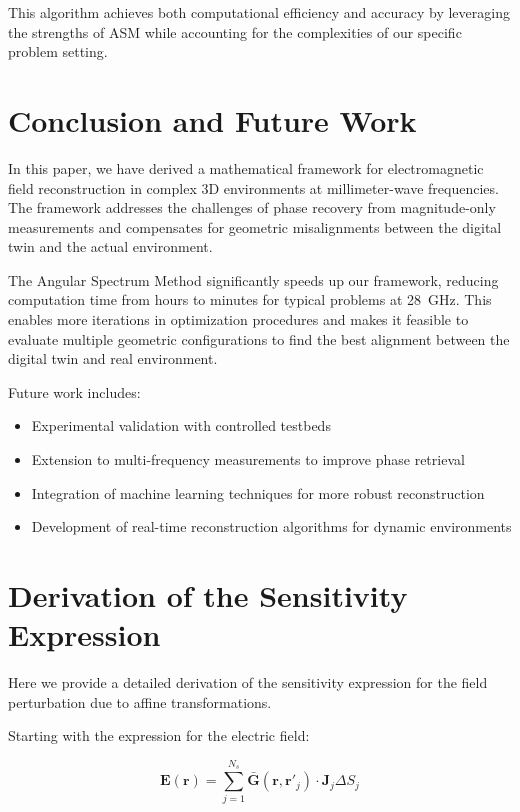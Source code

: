 \documentclass[12pt,a4paper]{article}
\begin{document}
This algorithm achieves both computational efficiency and accuracy by leveraging the strengths of ASM while accounting for the complexities of our specific problem setting.

\section{Conclusion and Future Work}

In this paper, we have derived a mathematical framework for electromagnetic field reconstruction in complex 3D environments at millimeter-wave frequencies. The framework addresses the challenges of phase recovery from magnitude-only measurements and compensates for geometric misalignments between the digital twin and the actual environment.

The Angular Spectrum Method significantly speeds up our framework, reducing computation time from hours to minutes for typical problems at \SI{28}{\giga\hertz}. This enables more iterations in optimization procedures and makes it feasible to evaluate multiple geometric configurations to find the best alignment between the digital twin and real environment.

Future work includes:
\begin{itemize}
    \item Experimental validation with controlled testbeds
    \item Extension to multi-frequency measurements to improve phase retrieval
    \item Integration of machine learning techniques for more robust reconstruction
    \item Development of real-time reconstruction algorithms for dynamic environments
\end{itemize}

\appendix
\section{Derivation of the Sensitivity Expression}

Here we provide a detailed derivation of the sensitivity expression for the field perturbation due to affine transformations.

Starting with the expression for the electric field:

\begin{equation}
    \mathbf{E}(\mathbf{r}) = \sum_{j=1}^{N_s} \bar{\mathbf{G}}(\mathbf{r}, \mathbf{r}'_j) \cdot \mathbf{J}_j \Delta S_j
\end{equation}
\end{document}
